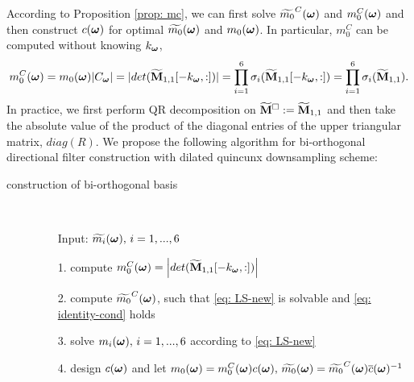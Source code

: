 According to Proposition \ref{prop: mc}, we can first solve $\widetilde{m_{0}}^C(\boldsymbol{\omega})$ and $m_0^C(\boldsymbol{\omega})$ and then construct $c(\boldsymbol{\omega})$ for optimal $\widetilde{m_{0}}(\boldsymbol{\omega})$ and $m_0(\boldsymbol{\omega})$. 
In particular, $m_0^C$ can be computed without knowing $k_{\boldsymbol{\omega}}$,
\begin{align}\label{eq: m0C}
m_0^C(\boldsymbol{\omega}) = m_0(\boldsymbol{\omega})|C_{\boldsymbol{\omega}}| = |det(\widetilde{\mathbf{M}}_{1,1}[-k_{\boldsymbol{\omega}},:])| = \prod_{i=1}^6\sigma_i(\widetilde{\mathbf{M}}_{1,1}[-k_{\boldsymbol{\omega}},:]) = \prod_{i=1}^6\sigma_i(\widetilde{\mathbf{M}}_{1,1}).
\end{align}
In practice, we first perform QR decomposition on $\widetilde{\mathbf{M}}^{\Box}:=\widetilde{\mathbf{M}}_{1,1}$ and then take the absolute value of the product of the diagonal entries of the upper triangular matrix, $diag(R)$. 
We propose the following algorithm for bi-orthogonal directional filter construction with dilated quincunx downsampling scheme:
\begin{description}%
\item[construction of bi-orthogonal basis]\
\begin{itemize}
\item[Input:] $\widetilde{m_{i}}(\boldsymbol{\omega}),\,i=1,...,6$
\item[1.] compute $m_0^C(\boldsymbol{\omega}) = \left|det(\widetilde{\mathbf{M}}_{1,1}[-k_{\boldsymbol{\omega}},:])\right|$
\item[2.] compute $\widetilde{m_{0}}^C(\boldsymbol{\omega})$, such that \eqref{eq: LS-new} is solvable and \eqref{eq: identity-cond} holds
\item[3.] solve $m_i(\boldsymbol{\omega}),\, i=1,...,6$ according to \eqref{eq: LS-new}
\item[4.] design $c(\boldsymbol{\omega})$ and let $m_0(\boldsymbol{\omega}) = m_0^C(\boldsymbol{\omega})c(\boldsymbol{\omega}),\,\widetilde{m_{0}}(\boldsymbol{\omega}) = \widetilde{m_{0}}^C(\boldsymbol{\omega})\overline{c}(\boldsymbol{\omega})^{-1}$
\end{itemize}
\end{description}

